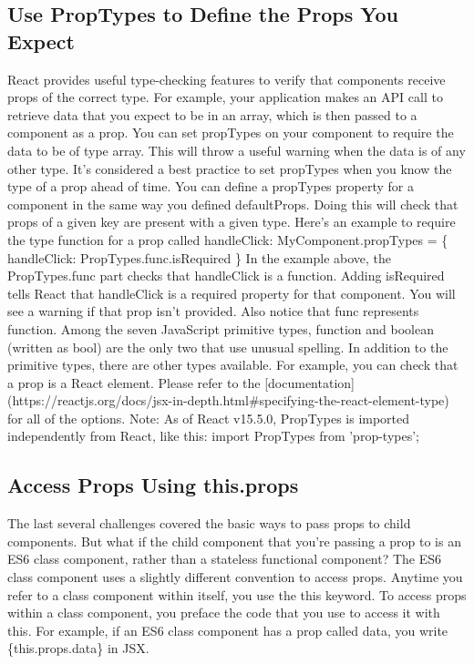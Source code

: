\documentclass{article}%
\begin{document}
\subsection{Use PropTypes to Define the Props You Expect}%
\label{subsec:UsePropTypestoDefinethePropsYouExpect}%
React provides useful type{-}checking features to verify that components receive props of the correct type. For example, your application makes an API call to retrieve data that you expect to be in an array, which is then passed to a component as a prop. You can set propTypes on your component to require the data to be of type array. This will throw a useful warning when the data is of any other type.\newline%
It's considered a best practice to set propTypes when you know the type of a prop ahead of time. You can define a propTypes property for a component in the same way you defined defaultProps. Doing this will check that props of a given key are present with a given type. Here's an example to require the type function for a prop called handleClick:\newline%
MyComponent.propTypes = \{ handleClick: PropTypes.func.isRequired \}\newline%
In the example above, the PropTypes.func part checks that handleClick is a function. Adding isRequired tells React that handleClick is a required property for that component. You will see a warning if that prop isn't provided. Also notice that func represents function. Among the seven JavaScript primitive types, function and boolean (written as bool) are the only two that use unusual spelling. In addition to the primitive types, there are other types available. For example, you can check that a prop is a React element. Please refer to the {[}documentation{]}(https://reactjs.org/docs/jsx{-}in{-}depth.html\#specifying{-}the{-}react{-}element{-}type) for all of the options.\newline%
Note: As of React v15.5.0, PropTypes is imported independently from React, like this:\newline%
import PropTypes from 'prop{-}types';\newline%

%
\subsection{Access Props Using this.props}%
\label{subsec:AccessPropsUsingthis.props}%
The last several challenges covered the basic ways to pass props to child components. But what if the child component that you're passing a prop to is an ES6 class component, rather than a stateless functional component? The ES6 class component uses a slightly different convention to access props.\newline%
Anytime you refer to a class component within itself, you use the this keyword. To access props within a class component, you preface the code that you use to access it with this. For example, if an ES6 class component has a prop called data, you write \{this.props.data\} in JSX.\newline%
\end{document}
